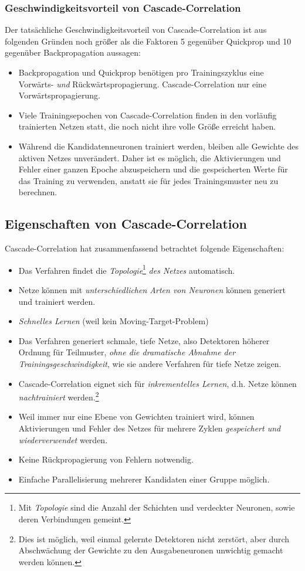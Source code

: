 \subsubsection*{Geschwindigkeitsvorteil von Cascade-Correlation}
Der tatsächliche Geschwindigkeitsvorteil von Cascade-Correlation ist aus folgenden Gründen noch größer als die Faktoren 5 gegenüber Quickprop und 10 gegenüber Backpropagation aussagen:

\begin{itemize}
	\item Backpropagation und Quickprop benötigen pro Trainingszyklus eine Vorwärts- \emph{und} Rückwärtspropagierung. Cascade-Correlation nur eine Vorwärtspropagierung.
	\item Viele Trainingsepochen von Cascade-Correlation finden in den vorläufig trainierten Netzen statt, die noch nicht ihre volle Größe erreicht haben.
	\item Während die Kandidatenneuronen trainiert werden, bleiben alle Gewichte des aktiven Netzes unverändert. Daher ist es möglich, die Aktivierungen und Fehler einer ganzen Epoche abzuspeichern und die gespeicherten Werte für das Training zu verwenden, anstatt sie für jedes Trainingsmuster neu zu berechnen.
\end{itemize}

\subsection*{Eigenschaften von Cascade-Correlation}
Cascade-Correlation hat zusammenfassend betrachtet folgende Eigenschaften:

\begin{itemize}
	\item Das Verfahren findet die \emph{Topologie}\footnote{Mit \emph{Topologie} sind die Anzahl der Schichten und verdeckter Neuronen, sowie deren Verbindungen gemeint.} \emph{des Netzes} automatisch.
	\item Netze können mit \emph{unterschiedlichen Arten von Neuronen} können generiert und trainiert werden.
	\item \emph{Schnelles Lernen} (weil kein Moving-Target-Problem)
	\item Das Verfahren generiert schmale, tiefe Netze, also Detektoren höherer Ordnung für Teilmuster, \emph{ohne die dramatische Abnahme der Trainingsgeschwindigkeit}, wie sie andere Verfahren für tiefe Netze zeigen.
	\item Cascade-Correlation eignet sich für \emph{inkrementelles Lernen}, d.h. Netze können \emph{nachtrainiert} werden.\footnote{Dies ist möglich, weil einmal gelernte Detektoren nicht zerstört, aber durch Abschwächung der Gewichte zu den Ausgabeneuronen unwichtig gemacht werden können.}
	\item Weil immer nur eine Ebene von Gewichten trainiert wird, können Aktivierungen und Fehler des Netzes für mehrere Zyklen \emph{gespeichert und wiederverwendet} werden.
	\item Keine Rückpropagierung von Fehlern notwendig.
	\item Einfache Parallelisierung mehrerer Kandidaten einer Gruppe möglich.
\end{itemize}


